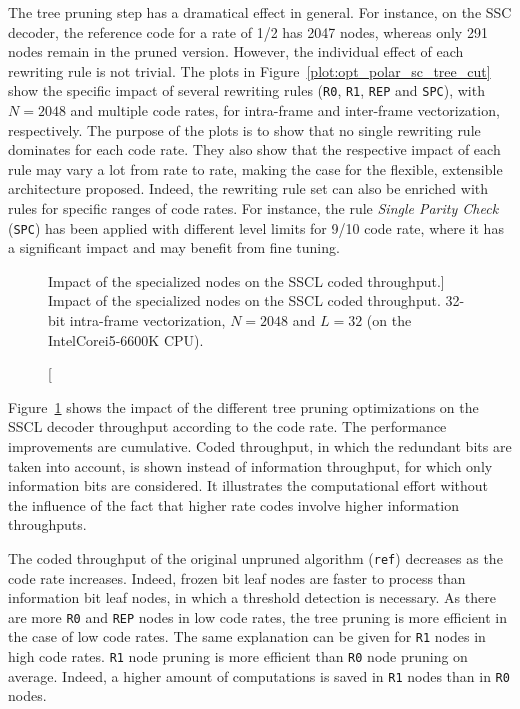 The tree pruning step has a dramatical effect in general. For instance, on the
SSC decoder, the reference code for a rate of 1/2 has 2047 nodes, whereas only
291 nodes remain in the pruned version. However, the individual effect of each
rewriting rule is not trivial. The plots in
Figure~\ref{plot:opt_polar_sc_tree_cut} show the specific impact of several
rewriting rules (\verb|R0|, \verb|R1|, \verb|REP| and \verb|SPC|), with
$N = 2048$ and multiple code rates, for intra-frame and inter-frame
vectorization, respectively. The purpose of the plots is to show that no single
rewriting rule dominates for each code rate. They also show that the respective
impact of each rule may vary a lot from rate to rate, making the case for the
flexible, extensible architecture proposed. Indeed, the rewriting rule set can
also be enriched with rules for specific ranges of code rates. For instance, the
rule \emph{Single Parity Check} (\verb|SPC|) has been applied with different
level limits for 9/10 code rate, where it has a significant impact and may
benefit from fine tuning.

\begin{figure}[htp]
  \centering
  \caption
    [Impact of the specialized nodes on the SSCL coded throughput.]
    {Impact of the specialized nodes on the SSCL coded throughput.
    32-bit intra-frame vectorization, $N=2048$ and $L=32$
    (on the Intel\R Core\TM i5-6600K CPU).}
  \label{plot:opt_polar_scl_tree_cut}
\end{figure}

Figure~\ref{plot:opt_polar_scl_tree_cut} shows the impact of the different tree
pruning optimizations on the SSCL decoder throughput according to the code
rate. The performance improvements are cumulative. Coded throughput, in which
the redundant bits are taken into account, is shown instead of information
throughput, for which only information bits are considered. It illustrates the
computational effort without the influence of the fact that higher rate codes
involve higher information throughputs.

The coded throughput of the original unpruned algorithm (\verb|ref|) decreases
as the code rate increases. Indeed, frozen bit leaf nodes are faster to process
than information bit leaf nodes, in which a threshold detection is necessary. As
there are more \verb|R0| and \verb|REP| nodes in low code rates, the tree
pruning is more efficient in the case of low code rates. The same explanation
can be given for \verb|R1| nodes in high code rates. \verb|R1| node pruning is
more efficient than \verb|R0| node pruning on average. Indeed, a higher amount
of computations is saved in \verb|R1| nodes than in \verb|R0| nodes.


